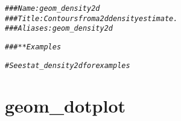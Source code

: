\documentclass[a4paper,titlepage]{tufte-handout}\usepackage[]{graphicx}\usepackage[]{color}
\makeatletter
\newcommand{\hlcom}[1]{\textcolor[rgb]{0.678,0.584,0.686}{\textit{#1}}}%
\newenvironment{kframe}{%
 \def\at@end@of@kframe{}%
 \ifinner\ifhmode%
  \def\at@end@of@kframe{\end{minipage}}%
  \begin{minipage}{\columnwidth}%
 \fi\fi%
 \def\FrameCommand##1{\hskip\@totalleftmargin \hskip-\fboxsep
 \colorbox{shadecolor}{##1}\hskip-\fboxsep
     \hskip-\linewidth \hskip-\@totalleftmargin \hskip\columnwidth}%
 \MakeFramed {\advance\hsize-\width
   \@totalleftmargin\z@ \linewidth\hsize
   \@setminipage}}%
 {\par\unskip\endMakeFramed%
 \at@end@of@kframe}
\newenvironment{knitrout}{}{} %
\makeatother
\begin{document}
\begin{knitrout}
\color{fgcolor}\begin{kframe}
\begin{alltt}
\hlcom{### Name: geom_density2d}
\hlcom{### Title: Contours from a 2d density estimate.}
\hlcom{### Aliases: geom_density2d}

\hlcom{### ** Examples}

\hlcom{# See stat_density2d for examples}
\end{alltt}
\end{kframe}
\end{knitrout}


\section{geom\_dotplot}
\end{document}
